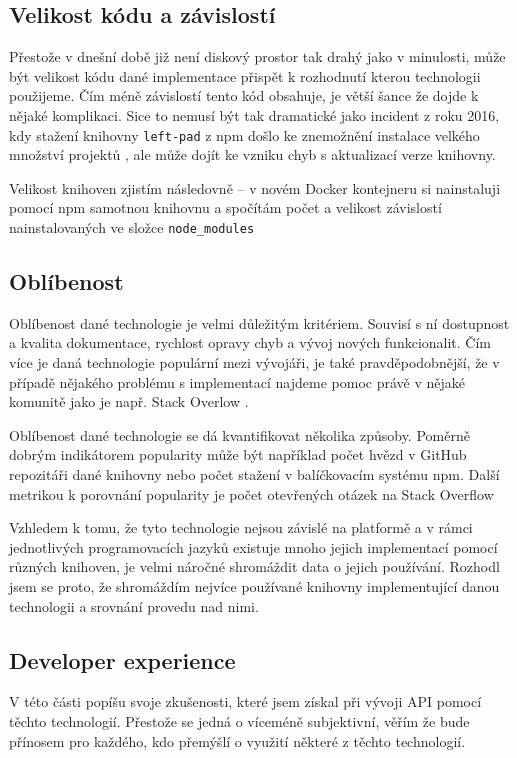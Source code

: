 \documentclass[thesis=M,czech]{FITthesis}[2019/12/23]
\begin{document}
\subsection{Velikost kódu a závislostí}
Přestože v dnešní době již není diskový prostor tak drahý jako v minulosti, může být velikost kódu dané implementace přispět k rozhodnutí kterou technologii použijeme. Čím méně závislostí tento kód obsahuje, je větší šance že dojde k nějaké komplikaci. Sice to nemusí být tak dramatické jako incident z roku 2016, kdy stažení knihovny \texttt{left-pad} z npm došlo ke znemožnění instalace velkého množství projektů \cite{left_pad},  ale může dojít ke vzniku chyb s aktualizací verze knihovny.

Velikost knihoven zjistím následovně -- v novém Docker kontejneru si nainstaluji pomocí npm samotnou knihovnu a spočítám počet a velikost závislostí nainstalovaných ve složce \texttt{node_modules}


\subsection{Oblíbenost}
Oblíbenost dané technologie je velmi důležitým kritériem. Souvisí s ní dostupnost a kvalita dokumentace, rychlost opravy chyb a vývoj nových funkcionalit. Čím více je daná technologie populární mezi vývojáři, je také pravděpodobnější, že v případě nějakého problému s implementací najdeme pomoc právě v nějaké komunitě jako je např. Stack Overlow \cite{stack_overflow}.

Oblíbenost dané technologie se dá kvantifikovat několika způsoby. Poměrně dobrým indikátorem popularity může být například počet hvězd v GitHub repozitáři dané knihovny nebo počet stažení v balíčkovacím systému npm. Další metrikou k porovnání popularity je počet otevřených otázek na Stack Overflow

Vzhledem k tomu, že tyto technologie nejsou závislé na platformě a v rámci jednotlivých programovacích jazyků existuje mnoho jejich implementací pomocí různých knihoven, je velmi náročné shromáždit data o jejich používání. Rozhodl jsem se proto, že shromáždím nejvíce používané knihovny implementující danou technologii a srovnání provedu nad nimi.

\subsection{Developer experience}
V této části popíšu svoje zkušenosti, které jsem získal při vývoji API pomocí těchto technologií. Přestože se jedná o víceméně subjektivní, věřím že bude přínosem pro každého, kdo přemýšlí o využití některé z těchto technologií.
\end{document}
